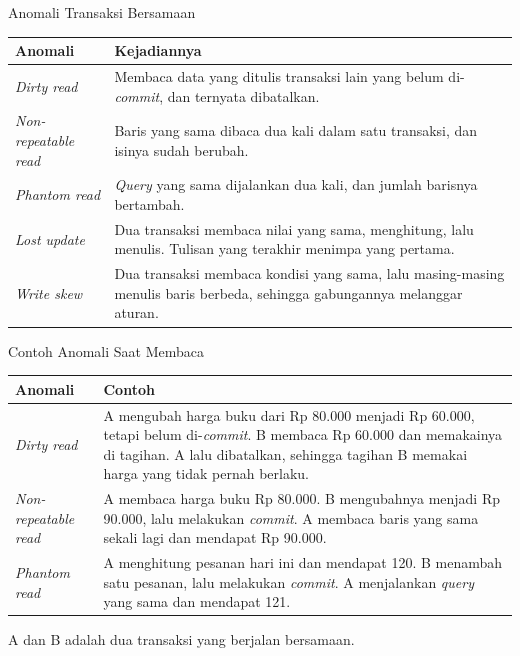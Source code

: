 \documentclass[aspectratio=169, table, 12pt]{beamer}
\begin{document}
\begin{frame}{{\Large Anomali Transaksi Bersamaan}}
  \vspace{5pt}
  \centering
  {\footnotesize
  \begin{tabularx}{\textwidth}{lX}
    \hline
    \textbf{Anomali} & \textbf{Kejadiannya} \\
    \hline
    \textit{Dirty read} & Membaca data yang ditulis transaksi lain yang belum di-\textit{commit}, dan ternyata dibatalkan. \\
    \hline
    \textit{Non-repeatable read} & Baris yang sama dibaca dua kali dalam satu transaksi, dan isinya sudah berubah. \\
    \hline
    \textit{Phantom read} & \textit{Query} yang sama dijalankan dua kali, dan jumlah barisnya bertambah. \\
    \hline
    \textit{Lost update} & Dua transaksi membaca nilai yang sama, menghitung, lalu menulis. Tulisan yang terakhir menimpa yang pertama. \\
    \hline
    \textit{Write skew} & Dua transaksi membaca kondisi yang sama, lalu masing-masing menulis baris berbeda, sehingga gabungannya melanggar aturan. \\
    \hline
  \end{tabularx}}
\end{frame}

\begin{frame}{{\Large Contoh Anomali Saat Membaca}}
  \vspace{5pt}
  \centering
  {\footnotesize
  \begin{tabularx}{\textwidth}{lX}
    \hline
    \textbf{Anomali} & \textbf{Contoh} \\
    \hline
    \textit{Dirty read} & A mengubah harga buku dari Rp 80.000 menjadi Rp 60.000, tetapi belum di-\textit{commit}. B membaca Rp 60.000 dan memakainya di tagihan. A lalu dibatalkan, sehingga tagihan B memakai harga yang tidak pernah berlaku. \\
    \hline
    \textit{Non-repeatable read} & A membaca harga buku Rp 80.000. B mengubahnya menjadi Rp 90.000, lalu melakukan \textit{commit}. A membaca baris yang sama sekali lagi dan mendapat Rp 90.000. \\
    \hline
    \textit{Phantom read} & A menghitung pesanan hari ini dan mendapat 120. B menambah satu pesanan, lalu melakukan \textit{commit}. A menjalankan \textit{query} yang sama dan mendapat 121. \\
    \hline
  \end{tabularx}}

  \vspace{8pt}
  {\footnotesize A dan B adalah dua transaksi yang berjalan bersamaan.}
\end{frame}
\end{document}
